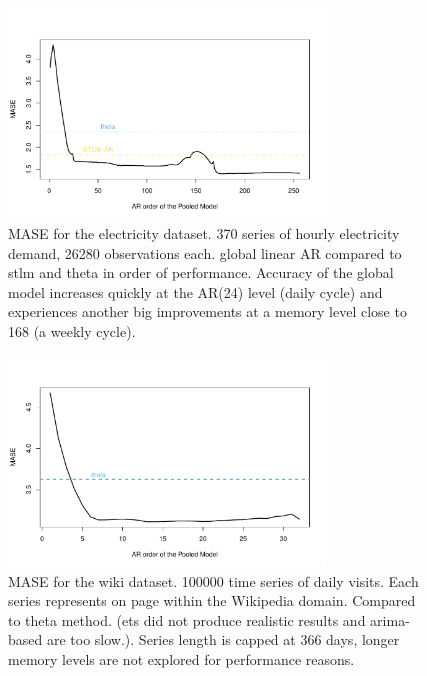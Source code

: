 \documentclass[a4paper]{article}
\theoremstyle{custom}
\begin{document}
\begin{figure}
  \centering
  \includegraphics[width=0.75\textwidth]{fig/electricity.pdf}
  \caption{MASE for the electricity dataset. 370 series of hourly electricity demand, 26280 observations each.
  global linear AR compared to stlm and theta in order of performance. Accuracy of the global model increases quickly at  the AR(24) level (daily cycle) and experiences another big improvements at a memory level close to 168 (a weekly cycle).}
  \label{fig:electricity}
\end{figure}

\begin{figure}
  \centering
  \includegraphics[width=0.75\textwidth]{fig/wiki.pdf}
  \caption{MASE for the wiki dataset. 100000 time series of daily visits. Each series represents on page within the Wikipedia domain. Compared to theta method. (ets did not produce realistic results and arima-based are too slow.).
  Series length is capped at 366 days, longer memory levels are not explored for performance reasons.}
  \label{fig:wiki}
\end{figure}
\end{document}
